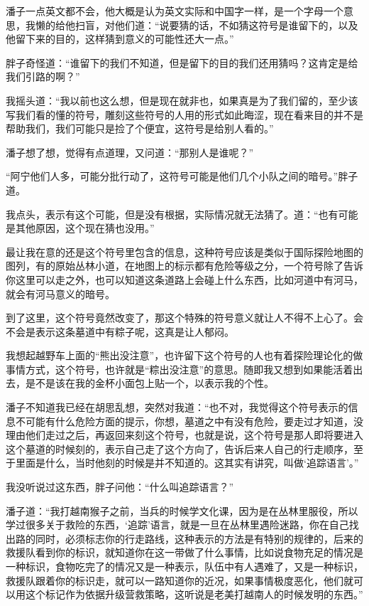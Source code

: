 潘子一点英文都不会，他大概是认为英文实际和中国字一样，是一个字母一个意思，我懒的给他扫盲，对他们道：“说要猜的话，不如猜这符号是谁留下的，以及他留下来的目的，这样猜到意义的可能性还大一点。”

胖子奇怪道：“谁留下的我们不知道，但是留下的目的我们还用猜吗？这肯定是给我们引路的啊？”

我摇头道：“我以前也这么想，但是现在就非也，如果真是为了我们留的，至少该写我们看的懂的符号，雕刻这些符号的人用的形式如此晦涩，现在看来目的并不是帮助我们，我们可能只是捡了个便宜，这符号是给别人看的。”

潘子想了想，觉得有点道理，又问道：“那别人是谁呢？”

“阿宁他们人多，可能分批行动了，这符号可能是他们几个小队之间的暗号。”胖子道。

我点头，表示有这个可能，但是没有根据，实际情况就无法猜了。道：“也有可能是其他原因，这个现在猜也没用。”

最让我在意的还是这个符号里包含的信息，这种符号应该是类似于国际探险地图的图列，有的原始丛林小道，在地图上的标示都有危险等级之分，一个符号除了告诉你这里可以走之外，也可以知道这条道路上会碰上什么东西，比如河道中有河马，就会有河马意义的暗号。

到了这里，这个符号竟然改变了，那这个特殊的符号意义就让人不得不上心了。会不会是表示这条墓道中有粽子呢，这真是让人郁闷。

我想起越野车上面的“熊出没注意”，也许留下这个符号的人也有着探险理论化的做事情方式，这个符号，也许就是“粽出没注意”的意思。随即我又想到如果能活着出去，是不是该在我的金杯小面包上贴一个，以表示我的个性。

潘子不知道我已经在胡思乱想，突然对我道：“也不对，我觉得这个符号表示的信息不可能有什么危险方面的提示，你想，墓道之中有没有危险，要走过才知道，没理由他们走过之后，再返回来刻这个符号，也就是说，这个符号是那人即将要进入这个墓道的时候刻的，表示自己走了这个方向了，告诉后来人自己的行走顺序，至于里面是什么，当时他刻的时候是并不知道的。这其实有讲究，叫做‘追踪语言’。”

我没听说过这东西，胖子问他：“什么叫追踪语言？”

潘子道：“我打越南猴子之前，当兵的时候学文化课，因为是在丛林里服役，所以学过很多关于救险的东西，‘追踪’语言，就是一旦在丛林里遇险迷路，你在自己找出路的同时，必须标志你的行走路线，这种表示的方法是有特别的规律的，后来的救援队看到你的标识，就知道你在这一带做了什么事情，比如说食物充足的情况是一种标识，食物吃完了的情况又是一种表示，队伍中有人遇难了，又是一种标识，救援队跟着你的标识走，就可以一路知道你的近况，如果事情极度恶化，他们就可以用这个标记作为依据升级营救策略，这听说是老美打越南人的时候发明的东西。”

